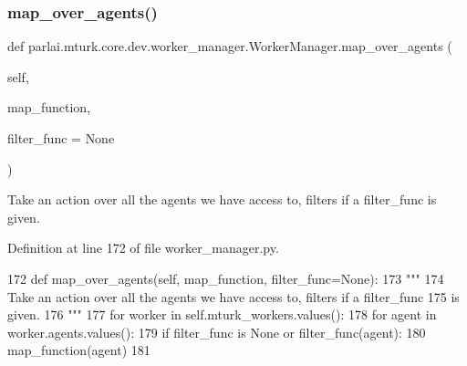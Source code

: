 \subsubsection{\texorpdfstring{map\+\_\+over\+\_\+agents()}{map\_over\_agents()}}
{\footnotesize\ttfamily def parlai.\+mturk.\+core.\+dev.\+worker\+\_\+manager.\+Worker\+Manager.\+map\+\_\+over\+\_\+agents (\begin{DoxyParamCaption}\item[{}]{self,  }\item[{}]{map\+\_\+function,  }\item[{}]{filter\+\_\+func = {\ttfamily None} }\end{DoxyParamCaption})}

\begin{DoxyVerb}Take an action over all the agents we have access to, filters if a filter_func
is given.
\end{DoxyVerb}
 

Definition at line 172 of file worker\+\_\+manager.\+py.


\begin{DoxyCode}
172     \textcolor{keyword}{def }map\_over\_agents(self, map\_function, filter\_func=None):
173         \textcolor{stringliteral}{"""}
174 \textcolor{stringliteral}{        Take an action over all the agents we have access to, filters if a filter\_func}
175 \textcolor{stringliteral}{        is given.}
176 \textcolor{stringliteral}{        """}
177         \textcolor{keywordflow}{for} worker \textcolor{keywordflow}{in} self.mturk\_workers.values():
178             \textcolor{keywordflow}{for} agent \textcolor{keywordflow}{in} worker.agents.values():
179                 \textcolor{keywordflow}{if} filter\_func \textcolor{keywordflow}{is} \textcolor{keywordtype}{None} \textcolor{keywordflow}{or} filter\_func(agent):
180                     map\_function(agent)
181 
\end{DoxyCode}
\mbox{\label{classparlai_1_1mturk_1_1core_1_1dev_1_1worker__manager_1_1WorkerManager_adf9deaf97b2ffe6600f2cf6ec9bc3232}} 
